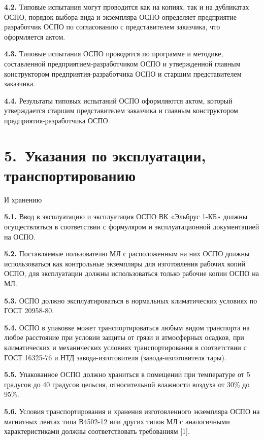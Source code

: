 \documentclass[11pt,a4paper]{article}
\begin{document}
\par\textbf{4.2.} Типовые испытания могут проводится как на копиях, так и на дубликатах ОСПО, порядок выбора вида и экземпляра ОСПО определяет предприятие-разработчик ОСПО по согласованию с представителем заказчика, что оформляется актом.\par
\par\textbf{4.3.} Типовые испытания ОСПО проводятся по программе и методике, составленной предприятием-разработчиком ОСПО и утвержденной главным конструктором предприятия-разработчика ОСПО и старшим представителем заказчика.\par
\par\textbf{4.4.} Результаты типовых испытаний ОСПО оформляются актом, который утверждается старшим представителем заказчика и главным конструктором предприятия-разработчика ОСПО.\par
\section*{5.~Указания по эксплуатации, транспортированию}
\begin{center}И хранению\end{center}
\par\textbf{5.1.} Ввод в эксплуатацию и эксплуатация ОСПО ВК «Эльбрус 1-КБ» должны осуществляться в соответствии с формуляром и эксплуатационной документацией на ОСПО.\par
\par\textbf{5.2.} Поставляемые пользователю МЛ с расположенным на них ОСПО должны использоваться как контрольные экземпляры для изготовления рабочих копий ОСПО, для эксплуатации должны использоваться только рабочие копии ОСПО на МЛ.\par
\par\textbf{5.3.} ОСПО должно эксплуатироваться в нормальных климатических условиях по ГОСТ 20958-80.\par
\par\textbf{5.4.} ОСПО в упаковке может транспортироваться любым видом транспорта на любое расстояние при условии защиты от грязи и атмосферных осадков, при климатических и механических условиях транспортирования в соответствии с ГОСТ 16325-76 и НТД завода-изготовителя (завода-изготовителя тары).\par
\par\textbf{5.5.} Упакованное ОСПО должно храниться в помещении при температуре от 5 градусов до 40 градусов цельсия, относительной влажности воздуха от 30\% до 95\%.\par
\par\textbf{5.6.} Условия транспортирования и хранения изготовленного экземпляра ОСПО на магнитных лентах типа В4502-12 или других типов МЛ с аналогичными характеристиками должны соответствовать требованиям [1].\par
\end{document}
